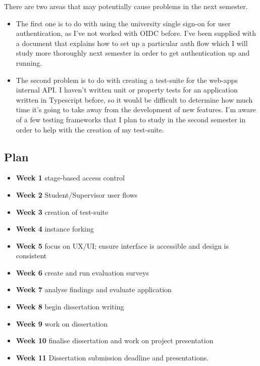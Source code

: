 \documentclass[11pt]{article}
\begin{document}
There are two areas that may potentially cause problems in the next semester.
\begin{itemize}
    \item The first one is to do with using the university single sign-on for user authentication, as I've not worked with OIDC before. I've been supplied with a document that explains how to set up a particular auth flow which I will study more thoroughly next semester in order to get authentication up and running.
    \item The second problem is to do with creating a test-suite for the web-apps internal API. I haven't written unit or property tests for an application written in Typescript before, so it would be difficult to determine how much time it's going to take away from the development of new features. I'm aware of a few testing frameworks that I plan to study in the second semester in order to help with the creation of my test-suite.
\end{itemize}


\subsection{Plan}\label{plan}

\begin{itemize}
    \item \textbf{Week 1} stage-based access control
    \item \textbf{Week 2} Student/Supervisor user flows
    \item \textbf{Week 3} creation of test-suite
    \item \textbf{Week 4} instance forking
    \item \textbf{Week 5} focus on UX/UI; ensure interface is accessible and design is consistent
    \item \textbf{Week 6} create and run evaluation surveys
    \item \textbf{Week 7} analyse findings and evaluate application
    \item \textbf{Week 8} begin dissertation writing
    \item \textbf{Week 9} work on dissertation
    \item \textbf{Week 10} finalise dissertation and work on project presentation
    \item \textbf{Week 11} Dissertation submission deadline and presentations.
\end{itemize}
    
    
\end{document}
